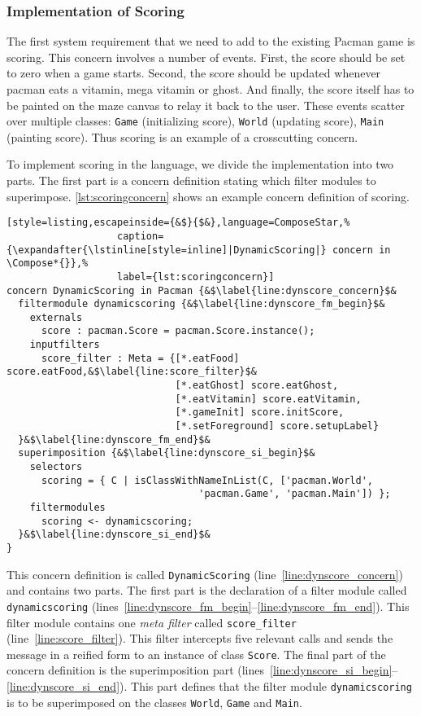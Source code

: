 \subsubsection{Implementation of Scoring}

The first system requirement that we need to add to the existing Pacman game is scoring.
This concern involves a number of events.
First, the score should be set to zero when a game starts.
Second, the score should be updated whenever pacman eats a vitamin, mega vitamin or ghost.
And finally, the score itself has to be painted on the maze canvas to relay it back to the user.
These events scatter over multiple classes: \lstinline|Game| (initializing score), \lstinline|World| (updating score), \lstinline|Main| (painting score).
Thus scoring is an example of a crosscutting concern. 

To implement scoring in the \Compose* language, we divide the implementation into two parts.
The first part is a \Compose* concern definition stating which filter modules to superimpose.
\autoref{lst:scoringconcern} shows an example \Compose* concern definition of scoring.

\begin{lstlisting}[style=listing,escapeinside={&$}{$&},language=ComposeStar,%
                   caption={\expandafter{\lstinline[style=inline]|DynamicScoring|} concern in \Compose*{}},%
                   label={lst:scoringconcern}]
concern DynamicScoring in Pacman {&$\label{line:dynscore_concern}$&
  filtermodule dynamicscoring {&$\label{line:dynscore_fm_begin}$&
    externals
      score : pacman.Score = pacman.Score.instance();
    inputfilters 
      score_filter : Meta = {[*.eatFood] score.eatFood,&$\label{line:score_filter}$&
                             [*.eatGhost] score.eatGhost,
                             [*.eatVitamin] score.eatVitamin,
                             [*.gameInit] score.initScore,
                             [*.setForeground] score.setupLabel}
  }&$\label{line:dynscore_fm_end}$&
  superimposition {&$\label{line:dynscore_si_begin}$&
    selectors
      scoring = { C | isClassWithNameInList(C, ['pacman.World',
                                 'pacman.Game', 'pacman.Main']) };
    filtermodules
      scoring <- dynamicscoring;
  }&$\label{line:dynscore_si_end}$&
}
\end{lstlisting}

This concern definition is called \lstinline|DynamicScoring| (line~\ref{line:dynscore_concern}) and contains two parts.
The first part is the declaration of a filter module called \lstinline|dynamicscoring| (lines~\ref{line:dynscore_fm_begin}--\ref{line:dynscore_fm_end}).
This filter module contains one \emph{meta filter} called \lstinline|score_filter| (line~\ref{line:score_filter}).
This filter intercepts five relevant calls and sends the message in a reified form to an instance of class \lstinline|Score|.
The final part of the concern definition is the superimposition part (lines~\ref{line:dynscore_si_begin}--\ref{line:dynscore_si_end}).
This part defines that the filter module \lstinline|dynamicscoring| is to be superimposed on the classes \lstinline|World|, \lstinline|Game| and \lstinline|Main|.

